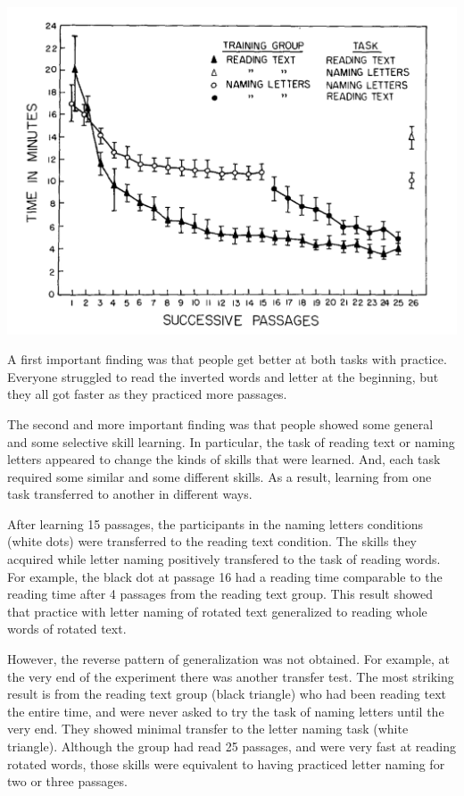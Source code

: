 \documentclass[
  oneside,
  12pt]{crumpbook}
\begin{document}
\begin{center}\includegraphics[width=1\linewidth]{imgs/Procedures_transfer} \end{center}

A first important finding was that people get better at both tasks with practice. Everyone struggled to read the inverted words and letter at the beginning, but they all got faster as they practiced more passages.

The second and more important finding was that people showed some general and some selective skill learning. In particular, the task of reading text or naming letters appeared to change the kinds of skills that were learned. And, each task required some similar and some different skills. As a result, learning from one task transferred to another in different ways.

After learning 15 passages, the participants in the naming letters conditions (white dots) were transferred to the reading text condition. The skills they acquired while letter naming positively transfered to the task of reading words. For example, the black dot at passage 16 had a reading time comparable to the reading time after 4 passages from the reading text group. This result showed that practice with letter naming of rotated text generalized to reading whole words of rotated text.

However, the reverse pattern of generalization was not obtained. For example, at the very end of the experiment there was another transfer test. The most striking result is from the reading text group (black triangle) who had been reading text the entire time, and were never asked to try the task of naming letters until the very end. They showed minimal transfer to the letter naming task (white triangle). Although the group had read 25 passages, and were very fast at reading rotated words, those skills were equivalent to having practiced letter naming for two or three passages.
\end{document}
